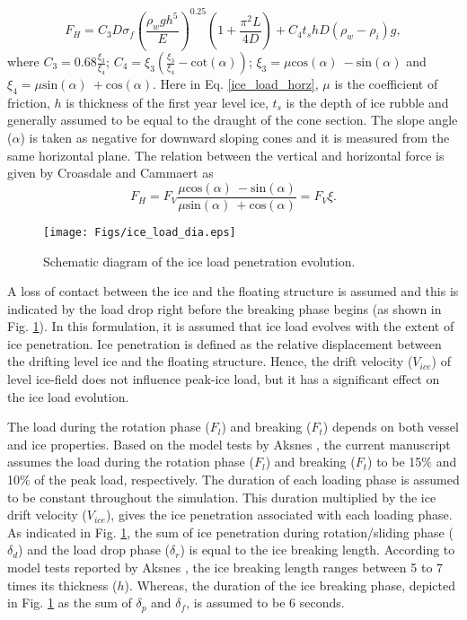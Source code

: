 \documentclass[review]{elsarticle}
\begin{document}
\begin{equation}\label{ice_load_horz} 
F_H=C_3D{\sigma }_f{\left(\frac{{\rho }_wgh^5}{E}\right)}^{0.25}\left(1+\frac{{\pi }^2L}{4D}\right)+C_4t_shD\left({\rho }_w-{\rho }_i\right)g,      
\end{equation} 
where $C_3=0.68\frac{{\xi }_3}{{\xi }_4}$; $C_4={\xi }_3\left(\frac{{\xi }_3}{{\xi }_4}-\mathrm{cot}(\alpha )\right)$; ${\xi }_3=\mu {\mathrm{cos} \left(\alpha \right)\ }-\mathrm{sin}(\alpha )$ and ${\xi }_4=\mu {\mathrm{sin} \left(\alpha \right)\ }+\mathrm{cos}(\alpha )$. Here in Eq. \eqref{ice_load_horz}, $\mu$ is the coefficient of friction, $h$ is thickness of the first year level ice, $t_s$ is the depth of ice rubble and generally assumed to be equal to the draught of the cone section. The slope angle ($\alpha$) is taken as negative for downward sloping cones and it is measured from the same horizontal plane. The relation between the vertical and horizontal force is given by Croasdale and Cammaert \cite{Croasdale_1994} as
\begin{equation} \label{ice_load_horz2} 
F_H=F_V\frac{\mu {\mathrm{cos} \left(\alpha \right)\ }-\mathrm{sin}(\alpha )}{\mu {\mathrm{sin} \left(\alpha \right)\ }+\mathrm{cos}(\alpha )}=F_V\xi.              
\end{equation} 

\begin{figure}
\centering
	\texttt{[image: Figs/ice\_load\_dia.eps]}
	\caption{Schematic diagram of the ice load penetration evolution.}
	\label{ice_load}
\end{figure}

A loss of contact between the ice and the floating structure is assumed and this is indicated by the load drop right before the breaking phase begins (as shown in Fig. \ref{ice_load}). In this formulation, it is assumed that ice load evolves with the extent of ice penetration. Ice penetration is defined as the relative displacement between the drifting level ice and the floating structure. Hence, the drift velocity ($V_{ice}$) of level ice-field does not influence peak-ice load, but it has a significant effect on the ice load evolution.

The load during the rotation phase ($F_l$) and breaking ($F_t$) depends on both vessel and ice properties. Based on the model tests by Aksnes \cite{Aksnes_2011},  the current manuscript assumes the load during the rotation phase ($F_l$) and breaking ($F_t$) to be 15$\%$ and 10$\%$ of the peak load, respectively. The duration of each loading phase is assumed to be constant throughout the simulation. This duration multiplied by the ice drift velocity ($V_{ice}$), gives the ice penetration associated with each loading phase. As indicated in Fig. \ref{ice_load}, the sum of ice penetration during rotation/sliding phase ($\delta_d$) and the load drop phase ($\delta_r$) is equal to the ice breaking length. According to model tests reported by Aksnes \cite{Aksnes_2011}, the ice breaking length ranges between 5 to 7 times its thickness ($h$). Whereas, the duration of the ice breaking phase, depicted in Fig. \ref{ice_load} as the sum of $\delta_p$ and $\delta_f$, is assumed to be 6 seconds.
\end{document}

